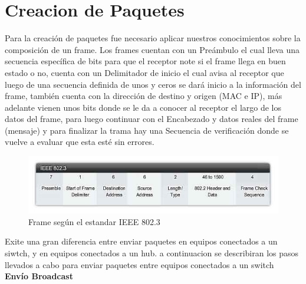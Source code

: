 \documentclass{udpreport}
\begin{document}
	\section{Creacion de Paquetes}
		Para la creación de paquetes fue necesario aplicar nuestros conocimientos sobre la composición de un frame.
		Los frames cuentan con un Preámbulo el cual lleva una secuencia específica de bits para que el receptor note si el
		frame llega en buen estado o no, cuenta con un Delimitador de inicio el cual avisa al receptor que luego de una
		secuencia definida de unos y ceros se dará inicio a la información del frame, también cuenta con la dirección de
		destino y origen (MAC e IP), más adelante vienen unos bits donde se le da a conocer al receptor el largo de los datos
		del frame, para luego continuar con el Encabezado y datos reales del frame (mensaje) y para finalizar la trama hay una
		Secuencia de verificación donde se vuelve a evaluar que esta esté sin errores.\\
		\begin{figure}[H]
		    \centering
		    \includegraphics[width=\textwidth]{frame.jpg}
		    \caption{Frame según el estandar IEEE 802.3}
		\end{figure}
		Exite una gran diferencia entre enviar paquetes en equipos conectados a un siwtch, y en equipos conectados a un hub. a continuacion se describiran los pasos llevados a cabo para enviar paquetes entre equipos conectados a un switch\\
		{\bf \large Envío Broadcast}\\
\end{document}

